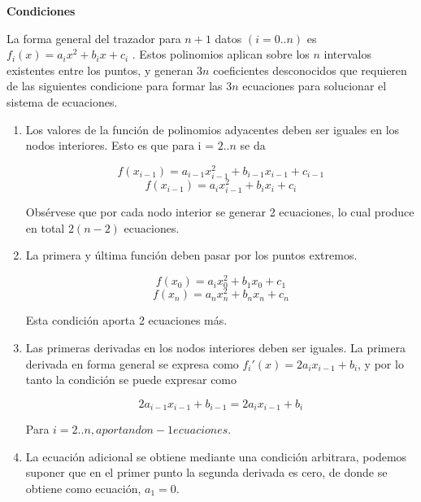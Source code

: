 \documentclass[letterpaper,10pt,oneside]{sphinxmanual}
\theoremstyle{plain}%
\theoremstyle{definition}%
\theoremstyle{remark}%
\begin{document}
\textbf{Condiciones}

La forma general del trazador para $n + 1$ datos $(i = 0..n)$ es $f_i(x) = a_ix^
2 +
b_ix+c_i$
. Estos polinomios aplican sobre los $n$ intervalos existentes entre los puntos,
y generan $3n$ coeficientes desconocidos que requieren de las siguientes condicione
para formar las $3n$ ecuaciones para solucionar el sistema de ecuaciones.

\begin{enumerate}
	\item Los valores de la función de polinomios adyacentes deben ser iguales en los
	nodos interiores. Esto es que para i = $2..n$ se da
	
	\begin{equation}
		f(x_{i-1})=a_{i-1}x^2_{i-1}+b_{i-1}x_{i-1}+c_{i-1} 
	\end{equation}
	\begin{equation}
		f(x_{i-1})=a_ix^2_{i-1}+b_ix_i+c_i
	\end{equation}
	
	Obsérvese que por cada nodo interior se generar 2 ecuaciones, lo cual produce en total $2(n-2)$ ecuaciones.
	
	\item La primera y última función deben pasar por los puntos extremos.
	
	\begin{equation}
	f(x_0)=a_ix^2_0+b_1x_0+c_1 
	\end{equation}
	\begin{equation}
	f(x_n)=a_nx^2_n+b_nx_n+c_n
	\end{equation}
	
	Esta condición aporta 2 ecuaciones más.
	
	\item Las primeras derivadas en los nodos interiores deben ser iguales. La primera derivada en forma general se expresa como $f_i'(x)=2a_ix_{i-1}+b_i$, y por lo tanto la condición se puede expresar como
	
	\begin{equation}
		2a_{i-1}x_{i-1}+b_{i-1}=2a_ix_{i-1}+b_i
	\end{equation}
	
	Para $i=2..n, aportando n-1 ecuaciones.$
	
	\item La ecuación adicional se obtiene mediante una condición arbitrara, podemos suponer que en el primer punto la segunda derivada es cero, de donde se obtiene como ecuación, $a_1=0$. 
	
\end{enumerate}
\end{document}

